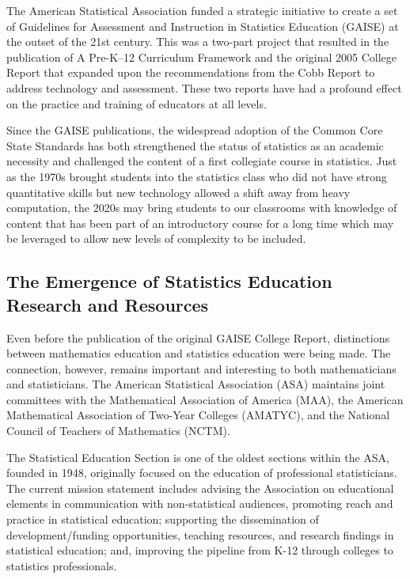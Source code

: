 The American Statistical Association funded a strategic initiative to create a set of Guidelines for Assessment and Instruction in Statistics Education (GAISE) at the outset of the 21st century.  This was a two-part project that resulted in the publication  of A Pre-K–12 Curriculum Framework  and the original 2005 College Report that expanded upon the recommendations from the Cobb Report to address technology and assessment. These two reports have had a profound effect on the practice and training of educators at all levels.

Since the GAISE publications, the widespread adoption of the Common Core State Standards  has both strengthened the status of statistics as an academic necessity and challenged the content of a first collegiate course in statistics.  Just as the 1970s brought students into the statistics class who did not have strong quantitative skills but new technology allowed a shift away from heavy computation, the 2020s may bring students to our classrooms with knowledge of content that has been part of an introductory course for a long time which may be leveraged to allow new levels of complexity to be included.

\subsection{The Emergence of Statistics Education Research and Resources}

Even before the publication of the original GAISE College Report, distinctions between mathematics education and statistics education were being made.  The connection, however, remains important and interesting to both mathematicians and statisticians.  The American Statistical Association (ASA) maintains joint committees with the Mathematical Association of America (MAA), the American Mathematical Association of Two-Year Colleges (AMATYC), and the National Council of Teachers of Mathematics (NCTM).

The Statistical Education Section is one of the oldest sections within the ASA, founded in 1948, originally focused on the education of professional statisticians.  The current mission statement includes advising the Association on educational elements in communication with non-statistical audiences, promoting reach and practice in statistical education; supporting the dissemination of development/funding opportunities, teaching resources, and research findings in statistical education; and, improving the pipeline from K-12 through colleges to statistics professionals. 

